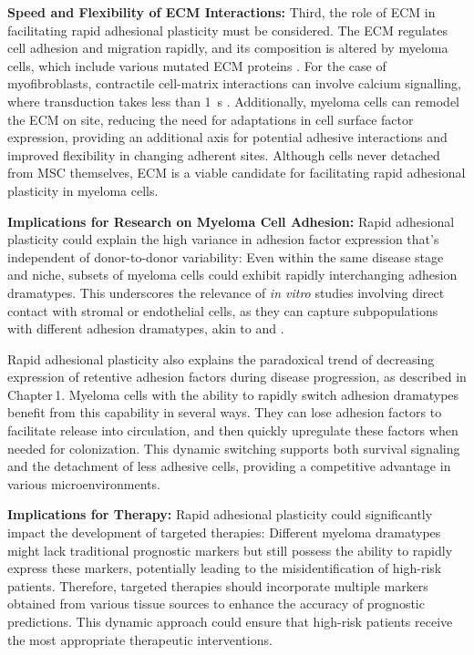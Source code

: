 \textbf{Speed and Flexibility of ECM Interactions:}
Third, the role of \ac{ECM} in facilitating rapid adhesional plasticity must be
considered. The \ac{ECM} regulates cell adhesion and migration rapidly, and its
composition is altered by myeloma cells, which include various mutated \ac{ECM}
proteins \cite{ibraheemBMMSCsderivedECMModifies2019,
      eversPrognosticValueExtracellular2023}. For the case of myofibroblasts,
contractile cell-matrix interactions can involve calcium signalling, where
transduction takes less than \SI{1}{\second} \cite{yamadaCell3DMatrix2022}.
Additionally, myeloma cells can remodel the \ac{ECM} on site, reducing the need
for adaptations in cell surface factor expression, providing an additional axis
for potential adhesive interactions and improved flexibility in changing
adherent sites. Although \MAina cells never detached from \ac{MSC} themselves,
\ac{ECM} is a viable candidate for facilitating rapid adhesional plasticity in
myeloma cells.



\textbf{Implications for Research on Myeloma Cell Adhesion:}
Rapid adhesional plasticity could explain the high variance in adhesion factor
expression that's independent of donor-to-donor variability: Even within the
same disease stage and niche, subsets of myeloma cells could exhibit rapidly
interchanging adhesion dramatypes. This underscores the relevance of \textit{in
      vitro} studies involving direct contact with stromal or endothelial cells, as
they can capture subpopulations with different adhesion dramatypes, akin to
\MAina and \nMAina.

Rapid adhesional plasticity also explains the paradoxical trend of decreasing
expression of retentive adhesion factors
during disease progression, as described in Chapter\,1. Myeloma cells with the
ability to rapidly switch adhesion dramatypes benefit from this capability in
several ways. They can lose adhesion factors to facilitate release into
circulation, and then quickly upregulate these factors when needed for
colonization. This dynamic switching supports both survival signaling and the
detachment of less adhesive cells, providing a competitive advantage in various
microenvironments.


\textbf{Implications for Therapy:}
Rapid adhesional plasticity could significantly impact the development of targeted
therapies: Different myeloma dramatypes might lack traditional prognostic
markers but still possess the ability to rapidly express these markers,
potentially leading to the misidentification of high-risk patients. Therefore,
targeted therapies should incorporate multiple markers obtained from various
tissue sources to enhance the accuracy of prognostic predictions. This
dynamic approach could ensure that high-risk patients receive the most
appropriate therapeutic interventions.



